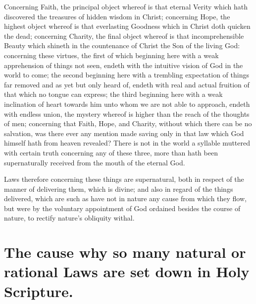 Concerning Faith, the principal object whereof is that eternal Verity which hath discovered the treasures of hidden wisdom in Christ; concerning Hope, the highest object whereof is that everlasting Goodness which in Christ doth quicken the dead; concerning Charity, the final object whereof is that incomprehensible Beauty which shineth in the countenance of Christ the Son of the living God: concerning these virtues, the first of which beginning here with a weak apprehension of things not seen, endeth with the intuitive vision of God in the world to come; the second beginning here with a trembling expectation of things far removed and as yet but only heard of, endeth with real and actual fruition of that which no tongue can express; the third beginning here with a weak inclination of heart towards him unto whom we are not able to approach, endeth with endless union, the  mystery whereof is higher than the reach of the thoughts of men; concerning that Faith, Hope, and Charity, without which there can be no salvation, was there ever any mention made saving only in that law which God himself hath from heaven revealed? There is not in the world a syllable muttered with certain truth concerning any of these three, more than hath been supernaturally received from the mouth of the eternal God.

Laws therefore concerning these things are supernatural, both in respect of the manner of delivering them, which is divine; and also in regard of the things delivered, which are such as have not in nature any cause from which they flow, but were by the voluntary appointment of God ordained besides the course of nature, to rectify nature’s obliquity withal.

\section*{The cause why so many natural or rational Laws are set down in Holy Scripture.}

